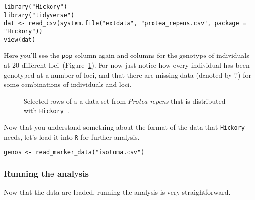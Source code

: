 \begin{verbatim}
library("Hickory")
library("tidyverse")
dat <- read_csv(system.file("extdata", "protea_repens.csv", package = "Hickory"))
view(dat)
\end{verbatim}

\noindent Here you'll see the {\tt pop} column again and columns for
the genotype of individuals at 20 different
loci~(Figure~\ref{fig:repens-csv}). For now just notice how
every individual has been genotyped at a number of loci, and that
there are missing data (denoted by '.') for some combinations of
individuals and loci.

\begin{figure}
  \begin{center}
  \end{center}
\caption{Selected rows of a a data set from {\it Protea repens\/} that
  is distributed with {\tt Hickory}~\cite{Prunier-etal-2017}.}\label{fig:repens-csv}
\end{figure}

Now that you understand something about the format of the data that
{\tt Hickory} needs, let's load it into {\tt R} for further analysis.

\begin{verbatim}
genos <- read_marker_data("isotoma.csv")
\end{verbatim}

\subsubsection*{Running the analysis}

Now that the data are loaded, running the analysis is very
straightforward.

